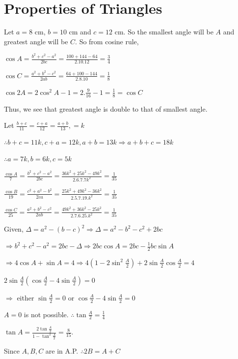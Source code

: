 \chapter{Properties of Triangles}
\startitemize[n, 1*broad]
\item Let $a = 8$ cm, $b = 10$ cm and $c = 12$ cm. So the smallest angle will be $A$ and greatest angle will
  be $C.$ So from cosine rule,

  $\cos A = \frac{b^2 + c^2 - a^2}{2bc} = \frac{100 + 144 - 64}{2.10.12} = \frac{3}{4}$

  $\cos C = \frac{a^2 + b^2 - c^2}{2ab} = \frac{64 + 100 - 144}{2.8.10} = \frac{1}{8}$

  $\cos 2A = 2\cos^2A - 1 = 2.\frac{9}{16} - 1 = \frac{1}{8} = \cos C$

  Thus, we see that greatest angle is double to that of smallest angle.
\item Let $\frac{b + c}{11} = \frac{c + a}{12} = \frac{a + b}{13}, = k$

  $\therefore b + c = 11k, c + a = 12k, a + b = 13k \Rightarrow a + b + c = 18k$

  $\therefore a = 7k, b = 6k, c = 5k$

  $\frac{\cos A}{7} = \frac{b^2 + c^2 - a^2}{2bc} = \frac{36k^2 + 25k^2 - 49k^2}{2.6.7.7k^2} = \frac{1}{35}$

  $\frac{\cos B}{19} = \frac{c^2 + a^2 - b^2}{2ca} = \frac{25k^2 + 49k^2 - 36k^2}{2.5.7.19.k^2} = \frac{1}{35}$

  $\frac{\cos C}{25} = \frac{a^2 + b^2 - c^2}{2ab} = \frac{49k^2 + 36k^2 - 25k^2}{2.7.6.25.k^2} = \frac{1}{35}$
\item Given, $\Delta = a^2 - (b - c)^2 \Rightarrow \Delta = a^2 - b^2 - c^2 + 2bc$

  $\Rightarrow b^2 + c ^2 - a^2 = 2bc - \Delta \Rightarrow 2bc\cos A = 2bc - \frac{1}{2}bc\sin A$

  $\Rightarrow 4\cos A + \sin A = 4 \Rightarrow 4\left(1 - 2\sin^2\frac{A}{2}\right) + 2\sin\frac{A}{2}\cos\frac{A}{2} = 4$

  $2\sin\frac{A}{2}\left(\cos\frac{A}{2} - 4\sin\frac{A}{2}\right) = 0$

  $\Rightarrow$ either $\sin\frac{A}{2} = 0$ or $\cos\frac{A}{2} - 4\sin\frac{A}{2} = 0$

  $A = 0$ is not possible. $\therefore \tan\frac{A}{2} = \frac{1}{4}$

  $\tan A = \frac{2\tan\frac{A}{2}}{1 - \tan^2\frac{A}{2}} = \frac{8}{15}.$
\item Since $A, B, C$ are in A.P. $\therefore 2B = A + C$

